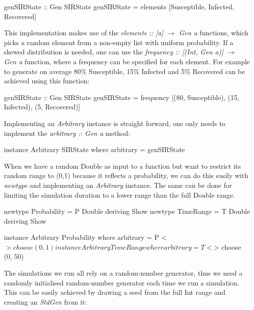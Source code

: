 \begin{HaskellCode}
genSIRState :: Gen SIRState
genSIRState = elements [Susceptible, Infected, Recovered]
\end{HaskellCode}

This implementation makes use of the \textit{elements :: [a] $\rightarrow$ Gen a} functions, which picks a random element from a non-empty list with uniform probability. If a skewed distribution is needed, one can use the \textit{frequency :: [(Int, Gen a)] $\rightarrow$ Gen a} function, where a frequency can be specified for each element. For example to generate on average 80\% Susceptible, 15\% Infected and 5\% Recovered can be achieved using this function:

\begin{HaskellCode}
genSIRState :: Gen SIRState
genSIRState = frequency [(80, Susceptible), (15, Infected), (5, Recovered)]
\end{HaskellCode}

Implementing an \textit{Arbitrary} instance is straight forward, one only needs to implement the \textit{arbitrary :: Gen a} method:

\begin{HaskellCode}
instance Arbitrary SIRState where
  arbitrary = genSIRState
\end{HaskellCode}

When we have a random Double as input to a function but want to restrict its random range to (0,1) because it reflects a probability, we can do this easily with \textit{newtype} and implementing an \textit{Arbitrary} instance. The same can be done for limiting the simulation duration to a lower range than the full Double range.

\begin{HaskellCode}
newtype Probability = P Double deriving Show
newtype TimeRange   = T Double deriving Show

instance Arbitrary Probability where
  arbitrary = P <$> choose (0, 1)
  
instance Arbitrary TimeRange where
  arbitrary = T <$> choose (0, 50)
\end{HaskellCode}

The simulations we run all rely on a random-number generator, thus we need a randomly initialised random-number generator each time we run a simulation. This can be easily achieved by drawing a seed from the full Int range and creating an \textit{StdGen} from it:


